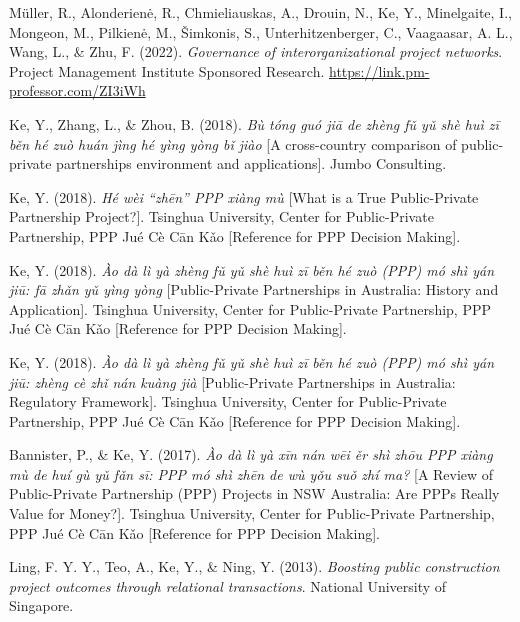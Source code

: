 \documentclass[11pt,a4paper]{report} %
\begin{document}
    \begin{tablist}

        \item[2022] \tab{}Müller, R., Alonderienė, R., Chmieliauskas, A., Drouin, N., Ke, Y., Minelgaite, I., Mongeon, M., Pilkienė, M., Šimkonis, S., Unterhitzenberger, C., Vaagaasar, A. L., Wang, L., \& Zhu, F. (2022). \textit{Governance of interorganizational project networks}. Project Management Institute Sponsored Research. \href{https://link.pm-professor.com/ZI3iWh}{https://link.pm-professor.com/ZI3iWh}
                
        \item[2018] \tab{}Ke, Y., Zhang, L., \& Zhou, B. (2018). \textit{Bù tóng guó jiā de zhèng fǔ yǔ shè huì zī běn hé zuò huán jìng hé yìng yòng bǐ jiào} [A cross-country comparison of public-private partnerships environment and applications]. Jumbo Consulting.

        \item[2018] \tab{}Ke, Y. (2018). \textit{Hé wèi “zhēn” PPP xiàng mù} [What is a True Public-Private Partnership Project?]. Tsinghua University, Center for Public-Private Partnership, PPP Jué Cè Cān Kǎo [Reference for PPP Decision Making]. 

        \item[2018] \tab{}Ke, Y. (2018). \textit{Ào dà lì yà zhèng fǔ yǔ shè huì zī běn hé zuò (PPP) mó shì yán jiū: fā zhǎn yǔ yìng yòng} [Public-Private Partnerships in Australia: History and Application]. Tsinghua University, Center for Public-Private Partnership, PPP Jué Cè Cān Kǎo [Reference for PPP Decision Making]. 

        \item[2018] \tab{}Ke, Y. (2018). \textit{Ào dà lì yà zhèng fǔ yǔ shè huì zī běn hé zuò (PPP) mó shì yán jiū: zhèng cè zhǐ nán kuàng jià} [Public-Private Partnerships in Australia: Regulatory Framework]. Tsinghua University, Center for Public-Private Partnership, PPP Jué Cè Cān Kǎo [Reference for PPP Decision Making]. 

        \item[2017] \tab{}Bannister, P., \& Ke, Y. (2017). \textit{Ào dà lì yà xīn nán wēi ěr shì zhōu PPP xiàng mù de huí gù yǔ fǎn sī: PPP mó shì zhēn de wù yǒu suǒ zhí ma?} [A Review of Public-Private Partnership (PPP) Projects in NSW Australia: Are PPPs Really Value for Money?]. Tsinghua University, Center for Public-Private Partnership, PPP Jué Cè Cān Kǎo [Reference for PPP Decision Making]. 
        
        \item[2013] \tab{}Ling, F. Y. Y., Teo, A., Ke, Y., \& Ning, Y. (2013). \textit{Boosting public construction project outcomes through relational transactions}. National University of Singapore.


\end{tablist}
\end{document}

